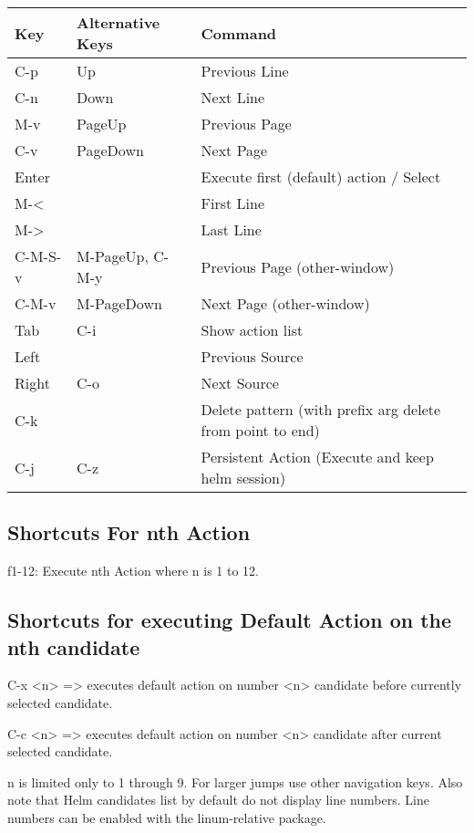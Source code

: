 \documentclass[11pt]{article}
\begin{document}
\begin{center}
\begin{tabular}{lll}
Key & Alternative Keys & Command\\
\hline
C-p & Up & Previous Line\\
C-n & Down & Next Line\\
M-v & PageUp & Previous Page\\
C-v & PageDown & Next Page\\
Enter &  & Execute first (default) action / Select\\
M-< &  & First Line\\
M-> &  & Last Line\\
C-M-S-v & M-PageUp, C-M-y & Previous Page (other-window)\\
C-M-v & M-PageDown & Next Page (other-window)\\
Tab & C-i & Show action list\\
Left &  & Previous Source\\
Right & C-o & Next Source\\
C-k &  & Delete pattern (with prefix arg delete from point to end)\\
C-j & C-z & Persistent Action (Execute and keep helm session)\\
\end{tabular}
\end{center}

\subsection{Shortcuts For nth Action}
\label{sec:orgd91bdeb}

f1-12: Execute nth Action where n is 1 to 12.

\subsection{Shortcuts for executing Default Action on the nth candidate}
\label{sec:orgf2f78b5}

C-x <n> => executes default action on number <n> candidate before currently selected candidate.

C-c <n> => executes default action on number <n> candidate after current selected candidate.

n is limited only to 1 through 9. For larger jumps use other
navigation keys. Also note that Helm candidates list by default
do not display line numbers. Line numbers can be enabled with the
linum-relative package.
\end{document}
